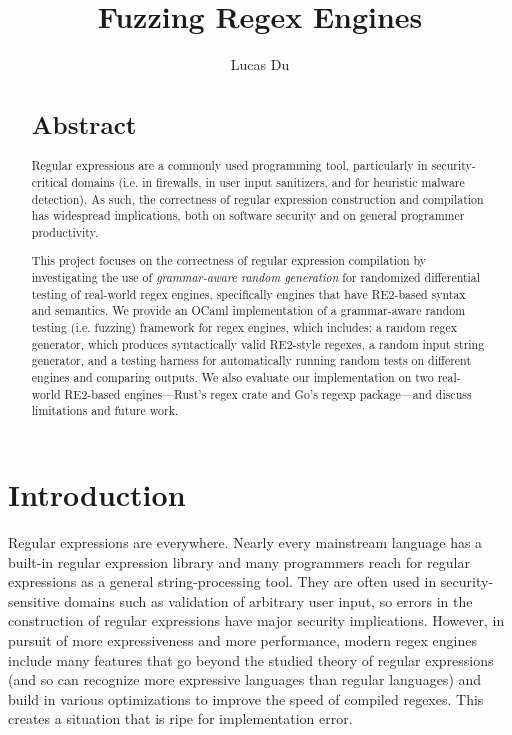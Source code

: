 \documentclass[acmsmall,nonacm,screen]{acmart}
\title{Fuzzing Regex Engines}
\author{Lucas Du}
\affiliation{
  \institution{University of California, Davis}
  \country{USA}
}
\begin{document}
\begin{abstract}
  \section*{Abstract}
  Regular expressions are a commonly used programming tool, particularly in security-critical domains (i.e. in firewalls, in user input sanitizers, and for heuristic malware detection). As such, the correctness of regular expression construction and compilation has widespread implications, both on software security and on general programmer productivity.

  This project focuses on the correctness of regular expression compilation by investigating the use of \textit{grammar-aware random generation} for randomized differential testing of real-world regex engines, specifically engines that have RE2-based syntax and semantics. We provide an OCaml implementation of a grammar-aware random testing (i.e. fuzzing) framework for regex engines, which includes: a random regex generator, which produces syntactically valid RE2-style regexes, a random input string generator, and a testing harness for automatically running random tests on different engines and comparing outputs. We also evaluate our implementation on two real-world RE2-based engines—Rust's regex crate and Go's regexp package—and discuss limitations and future work.
\end{abstract}

\maketitle

\section{Introduction}
Regular expressions are everywhere. Nearly every mainstream language has a built-in regular expression library and many programmers reach for regular expressions as a general string-processing tool. They are often used in security-sensitive domains such as validation of arbitrary user input, so errors in the construction of regular expressions have major security implications. However, in pursuit of more expressiveness and more performance, modern regex engines include many features that go beyond the studied theory of regular expressions (and so can recognize more expressive languages than regular languages) and build in various optimizations to improve the speed of compiled regexes. This creates a situation that is ripe for implementation error.
\end{document}
